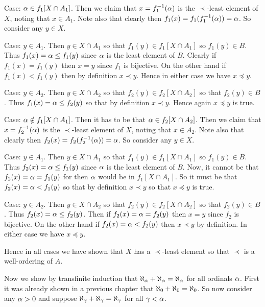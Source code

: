 \begin{solution}
    Case: $\alpha \in f_1[X \cap A_1]$.
    Then we claim that $x = f_1^{-1}(\alpha)$ is the $\prec$-least element of $X$, noting that $x \in A_1$.
    Note also that clearly then $f_1(x) = f_1(f_1^{-1}(\alpha)) = \alpha$.
    So consider any $y \in X$.
    \begin{indpar}
        Case: $y \in A_1$.
        Then $y \in X \cap A_1$ so that $f_1(y) \in f_1[X \cap A_1]$ so $f_1(y) \in B$.
        Thus $f_1(x) = \alpha \leq f_1(y)$ since $\alpha$ is the least element of $B$.
        Clearly if $f_1(x) = f_1(y)$ then $x = y$ since $f_1$ is bijective.
        On the other hand if $f_1(x) < f_1(y)$ then by definition $x \prec y$.
        Hence in either case we have $x \preceq y$.

        Case: $y \in A_2$.
        Then $y \in X \cap A_2$ so that $f_2(y) \in f_2[X \cap A_2]$ so that $f_2(y) \in B$.
        Thus $f_1(x) = \alpha \leq f_2(y)$ so that by definition $x \prec y$.
        Hence again $x \preceq y$ is true.
    \end{indpar}

    Case: $\alpha \notin f_1[X \cap A_1]$.
    Then it has to be that $\alpha \in f_2[X \cap A_2]$.
    Then we claim that $x = f_2^{-1}(\alpha)$ is the $\prec$-least element of $X$, noting that $x \in A_2$.
    Note also that clearly then $f_2(x) = f_2(f_2^{-1}(\alpha)) = \alpha$.
    So consider any $y \in X$.
    \begin{indpar}
        Case: $y \in A_1$.
        Then $y \in X \cap A_1$ so that $f_1(y) \in f_1[X \cap A_1]$ so $f_1(y) \in B$.
        Thus $f_2(x) = \alpha \leq f_1(y)$ since $\alpha$ is the least element of $B$.
        Now, it cannot be that $f_2(x) = \alpha = f_1(y)$ for then $\alpha$ would be in $f_1[X \cap A_1]$.
        So it must be that $f_2(x) = \alpha < f_1(y)$ so that by definition $x \prec y$ so that $x \preceq y$ is true.

        Case: $y \in A_2$.
        Then $y \in X \cap A_2$ so that $f_2(y) \in f_2[X \cap A_2]$ so that $f_2(y) \in B$.
        Thus $f_2(x) = \alpha \leq f_2(y)$.
        Then if $f_2(x) = \alpha = f_2(y)$ then $x = y$ since $f_2$ is bijective.
        On the other hand if $f_2(x) = \alpha < f_2(y)$ then $x \prec y$ by definition.
        In either case we have $x \preceq y$.
    \end{indpar}
    Hence in all cases we have shown that $X$ has a $\prec$-least element so that $\prec$ is a well-ordering of $A$.

    Now we show by transfinite induction that $\aleph_\alpha + \aleph_\alpha = \aleph_\alpha$ for all ordinals $\alpha$.
    First it was already shown in a previous chapter that $\aleph_0 + \aleph_0 = \aleph_0$.
    So now consider any $\alpha > 0$ and suppose $\aleph_\gamma + \aleph_\gamma = \aleph_\gamma$ for all $\gamma < \alpha$.


\end{solution}
